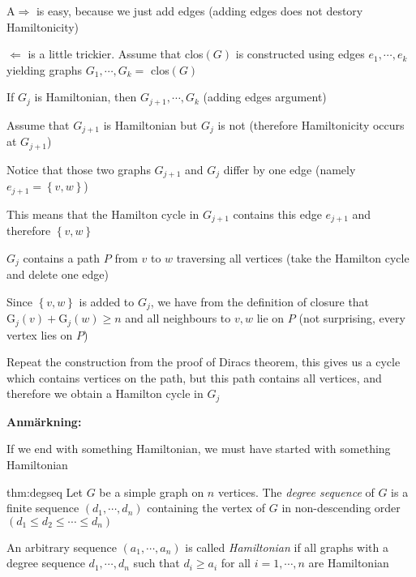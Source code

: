 \begin{prf}
  A$\Rightarrow$ is easy, because we just add edges (adding edges does not destory Hamiltonicity) 
  \par\bigskip
  \noindent $\Leftarrow$ is a little trickier. Assume that clos$(G)$ is constructed using edges $e_1,\cdots,e_k$ yielding graphs $G_1,\cdots,G_k = $ clos$(G)$
  \par\bigskip
  \noindent If $G_j$ is Hamiltonian, then $G_{j+1},\cdots,G_k$ (adding edges argument)
  \par\bigskip
  \noindent Assume that $G_{j+1}$ is Hamiltonian but $G_j$ is not (therefore Hamiltonicity occurs at $G_{j+1}$)\par
  \noindent Notice that those two graphs $G_{j+1}$ and $G_j$ differ by one edge (namely $e_{j+1} = \left\{v,w\right\}$) 
  \par\bigskip
  \noindent This means that the Hamilton cycle in $G_{j+1}$ contains this edge $e_{j+1}$ and therefore $\left\{v,w\right\}$
  \par\bigskip
  \noindent $G_j$ contains a path $P$ from $v$ to $w$ traversing all vertices (take the Hamilton cycle and delete one edge)
  \par\bigskip
  \noindent Since $\left\{v,w\right\}$ is added to $G_j$, we have from the definition of closure that $\text{G}_j(v)+ \text{G}_j(w)\geq n $ and all neighbours to $v,w$  lie on $P$ (not surprising, every vertex lies on $P$)
  \par\bigskip
  \noindent Repeat the construction from the proof of Diracs theorem, this gives us a cycle which contains vertices on the path, but this path contains all vertices, and therefore we obtain a Hamilton cycle in $G_j$
\end{prf}
\par\bigskip
\noindent\textbf{Anmärkning:}\par
\noindent If we end with something Hamiltonian, we must have started with something Hamiltonian
\par\bigskip
\begin{theo}{thm:degseq} 
  Let $G$ be a simple graph on $n$ vertices. The \textit{degree sequence} of $G$ is a finite sequence $(d_1,\cdots, d_n)$ containing the vertex of $G$ in non-descending order $(d_1\leq d_2\leq\cdots\leq d_n)$ 
  \par\bigskip
  \noindent An arbitrary sequence $(a_1,\cdots, a_n)$ is called \textit{Hamiltonian} if all graphs with a degree sequence $d_1,\cdots,d_n$ such that $d_i\geq a_i$ for all $i = 1,\cdots,n$ are Hamiltonian
\end{theo}
